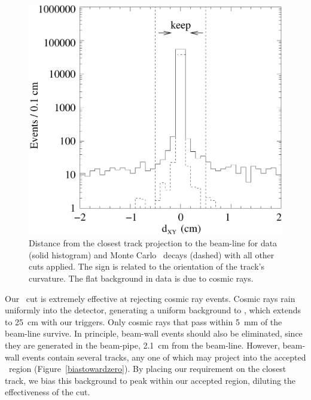\documentclass{cornell}
\begin{document}
\begin{figure}[p]
  \begin{center}
    \includegraphics[width=\linewidth]{plots/dxy}
  \end{center}
  \caption[Distribution of the closest track projection to the
  beam-line]{\label{dxy} Distance from the closest track projection to
  the beam-line for data (solid histogram) and Monte Carlo \ups\
  decays (dashed) with all other cuts applied.  The sign is related to
  the orientation of the track's curvature.  The flat background in
  data is due to cosmic rays.}
\end{figure}

Our \dxy\ cut is extremely effective at rejecting cosmic ray events.
Cosmic rays rain uniformly into the detector, generating a uniform
background to \dxy, which extends to 25~cm with our triggers.  Only
cosmic rays that pass within 5~mm of the beam-line survive.  In
principle, beam-wall events should also be eliminated, since they are
generated in the beam-pipe, 2.1~cm from the beam-line.  However,
beam-wall events contain several tracks, any one of which may project
into the accepted \dxy\ region (Figure~\ref{biastowardzero}).  By
placing our requirement on the closest track, we bias this background
to peak within our accepted region, diluting the effectiveness of the
cut.
\end{document}
